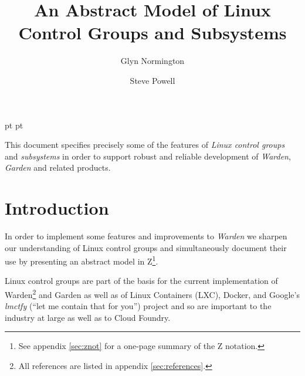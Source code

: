 \documentclass[a4paper,twoside,12pt]{article}
\begin{document}
 pt
 pt

\def\Slash{\slash\hspace{0pt}}

\title{An Abstract Model of Linux Control Groups and Subsystems}

\author{
Glyn Normington\and
Steve Powell
}

\maketitle
\thispagestyle{empty}
\setcounter{page}{1}


This document specifies precisely some of the features of \emph{Linux control groups} and \emph{subsystems} 
in order to support robust and reliable development of \emph{Warden}, \emph{Garden} and related products.


\newcommand{\true}{true}
\newcommand{\false}{false}
\renewcommand{\emptyset}{\varnothing}

\clearpage
\tableofcontents

\cleardoublepage
{}
\setcounter{page}{1}

\section{Introduction}

In order to implement some features and improvements to \emph{Warden} we sharpen our understanding of Linux control groups
and simultaneously document their use by presenting an abstract model in Z\footnote{See appendix \ref{sec:znot} for a one-page summary of the Z notation.}.

Linux control groups are part of the basis for the current implementation of Warden\cite{warden}\footnote{All references are listed in appendix \ref{sec:references}.} and 
Garden\cite{garden} as well as of Linux Containers (LXC), Docker, and Google's
\emph{lmctfy} (``let me contain that for you'') project and so are important to the industry at large as well as to Cloud
Foundry.
\end{document}

